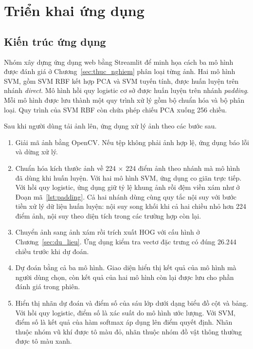 \section{Triển khai ứng dụng}
\label{sec:trien_khai}

\subsection{Kiến trúc ứng dụng}

Nhóm xây dựng ứng dụng web bằng Streamlit để minh họa cách ba mô hình được đánh giá ở Chương~\ref{sec:thuc_nghiem} phân loại từng ảnh. Hai mô hình SVM, gồm SVM RBF kết hợp PCA và SVM tuyến tính, được huấn luyện trên nhánh \emph{direct}. Mô hình hồi quy logistic cơ sở được huấn luyện trên nhánh \emph{padding}. Mỗi mô hình được lưu thành một quy trình xử lý gồm bộ chuẩn hóa và bộ phân loại. Quy trình của SVM RBF còn chứa phép chiếu PCA xuống 256 chiều.

Sau khi người dùng tải ảnh lên, ứng dụng xử lý ảnh theo các bước sau.

\begin{enumerate}
  \item Giải mã ảnh bằng OpenCV. Nếu tệp không phải ảnh hợp lệ, ứng dụng báo lỗi và dừng xử lý.
  \item Chuẩn hóa kích thước ảnh về 224 $\times$ 224 điểm ảnh theo nhánh mà mô hình đã dùng khi huấn luyện. Với hai mô hình SVM, ứng dụng co giãn trực tiếp. Với hồi quy logistic, ứng dụng giữ tỷ lệ khung ảnh rồi đệm viền xám như ở Đoạn mã~\ref{lst:padding}. Cả hai nhánh dùng cùng quy tắc nội suy với bước tiền xử lý dữ liệu huấn luyện: nội suy song khối khi cả hai chiều nhỏ hơn 224 điểm ảnh, nội suy theo diện tích trong các trường hợp còn lại.
  \item Chuyển ảnh sang ảnh xám rồi trích xuất HOG với cấu hình ở Chương~\ref{sec:du_lieu}. Ứng dụng kiểm tra vectơ đặc trưng có đúng 26.244 chiều trước khi dự đoán.
  \item Dự đoán bằng cả ba mô hình. Giao diện hiển thị kết quả của mô hình mà người dùng chọn, còn kết quả của hai mô hình còn lại được lưu cho phần đánh giá trong phiên.
  \item Hiển thị nhãn dự đoán và điểm số của sáu lớp dưới dạng biểu đồ cột và bảng. Với hồi quy logistic, điểm số là xác suất do mô hình ước lượng. Với SVM, điểm số là kết quả của hàm softmax áp dụng lên điểm quyết định. Nhãn thuộc nhóm vũ khí được tô màu đỏ, nhãn thuộc nhóm đồ vật thông thường được tô màu xanh.
\end{enumerate}

